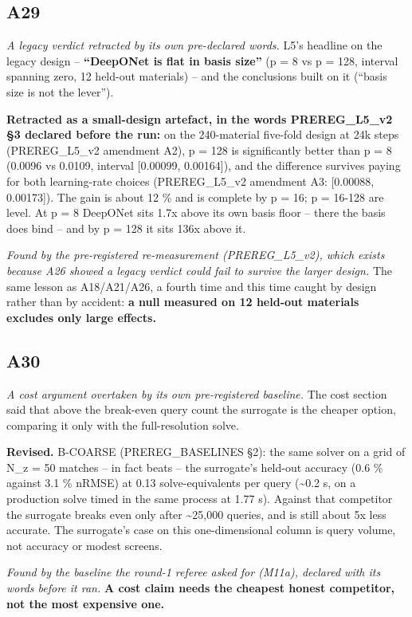 \documentclass[10pt]{article}
\begin{document}
\subsection*{A29}\label{led:A29}
\begin{description}[leftmargin=0pt,itemsep=1pt]
\item[Claim withdrawn.] \emph{A legacy verdict retracted by its own pre-declared words.} L5's headline on the legacy design -- \textbf{``DeepONet is flat in basis size''} (p = 8 vs p = 128, interval spanning zero, 12 held-out materials) -- and the conclusions built on it (``basis size is not the lever'').
\item[Replaced with.] \textbf{Retracted as a small-design artefact, in the words PREREG\_L5\_v2 §3 declared before the run:} on the 240-material five-fold design at 24k steps (PREREG\_L5\_v2 amendment A2), p = 128 is significantly better than p = 8 (0.0096 vs 0.0109, interval [0.00099, 0.00164]), and the difference survives paying for both learning-rate choices (PREREG\_L5\_v2 amendment A3: [0.00088, 0.00173]). The gain is about 12 \% and is complete by p = 16; p = 16-128 are level. At p = 8 DeepONet sits 1.7x above its own basis floor -- there the basis does bind -- and by p = 128 it sits 136x above it.
\item[Why it was wrong.] \emph{Found by the pre-registered re-measurement (PREREG\_L5\_v2), which exists because A26 showed a legacy verdict could fail to survive the larger design.} The same lesson as A18/A21/A26, a fourth time and this time caught by design rather than by accident: \textbf{a null measured on 12 held-out materials excludes only large effects.}
\end{description}
\subsection*{A30}\label{led:A30}
\begin{description}[leftmargin=0pt,itemsep=1pt]
\item[Claim withdrawn.] \emph{A cost argument overtaken by its own pre-registered baseline.} The cost section said that above the break-even query count the surrogate is the cheaper option, comparing it only with the full-resolution solve.
\item[Replaced with.] \textbf{Revised.} B-COARSE (PREREG\_BASELINES §2): the same solver on a grid of N\_z = 50 matches -- in fact beats -- the surrogate's held-out accuracy (0.6 \% against 3.1 \% nRMSE) at 0.13 solve-equivalents per query (\textasciitilde{}0.2 s, on a production solve timed in the same process at 1.77 s). Against that competitor the surrogate breaks even only after \textasciitilde{}25,000 queries, and is still about 5x less accurate. The surrogate's case on this one-dimensional column is query volume, not accuracy or modest screens.
\item[Why it was wrong.] \emph{Found by the baseline the round-1 referee asked for (M11a), declared with its words before it ran.} \textbf{A cost claim needs the cheapest honest competitor, not the most expensive one.}
\end{description}
\end{document}
